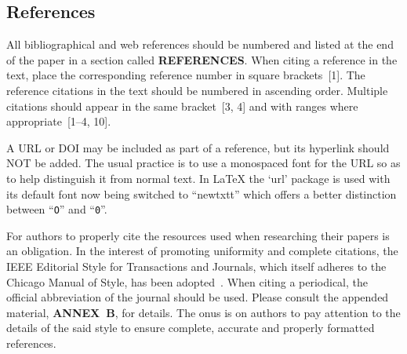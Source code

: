 \documentclass[letterpaper,
               nospread,     %
               ]{jacow}
\begin{document}
\subsection{References}
%
%
All bibliographical and web references should be numbered and listed at the
end of the paper in a section called \textbf{REFERENCES}. When citing a
reference in the text, place the corresponding reference number in square
brackets~[1]. The reference citations in the text should be numbered
in ascending order. Multiple citations should appear in
the same bracket~[3, 4] and
with ranges where appropriate~[1--4, 10].

A URL or DOI may be included as part of a reference, but its
hyperlink should NOT be added. The usual practice is to
use a monospaced font for the URL so as to help distinguish
it from normal text. In \LaTeX{} the ‘url’ package is used with its 
default font now being switched to ``newtxtt'' which offers
a better distinction between ``\texttt{O}'' and ``\texttt{0}''.

For authors to properly cite the resources used when researching
their papers is an obligation. In the interest of
promoting uniformity and complete citations, the IEEE
Editorial Style for Transactions and Journals, which itself 
adheres to the Chicago Manual of Style, has been adopted~\cite{IEEE}. 
When citing a periodical, the official abbreviation of the journal 
should be used\cite{journal-abbreviations}.
Please consult the appended material, \textbf{ANNEX~B},
for details. The onus is on authors to pay attention to
the details of the said style to ensure complete, accurate
and properly formatted references.
\end{document}
